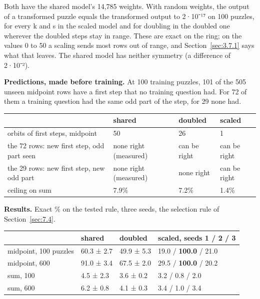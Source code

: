 Both have the shared model's 14,785 weights. With random weights, the output of a transformed puzzle equals the transformed output to 2·10⁻¹⁷ on 100 puzzles, for every k and s in the scaled model and for doubling in the doubled one wherever the doubled steps stay in range. These are exact on the ring; on the values 0 to 50 a scaling sends most rows out of range, and Section~\ref{sec:3.7.1} says what that leaves. The shared model has neither symmetry (a difference of 2·10⁻²).

\textbf{Predictions, made before training.} At 100 training puzzles, 101 of the 505 unseen midpoint rows have a first step that no training question had. For 72 of them a training question had the same odd part of the step, for 29 none had.

\begin{center}\small
\begin{tabularx}{\linewidth}{@{}YYll@{}}
\toprule
 & shared & doubled & scaled \\
\midrule
orbits of first steps, midpoint & 50 & 26 & 1 \\
the 72 rows: new first step, odd part seen & none right (measured) & can be right & can be right \\
the 29 rows: new first step, new odd part & none right (measured) & none right & can be right \\
ceiling on sum & 7.9\% & 7.2\% & 1.4\% \\
\bottomrule
\end{tabularx}
\end{center}

\textbf{Results.} Exact \% on the tested rule, three seeds, the selection rule of Section~\ref{sec:7.4}.

\begin{center}\small
\begin{tabular}{@{}llll@{}}
\toprule
 & shared & doubled & scaled, seeds 1 / 2 / 3 \\
\midrule
midpoint, 100 puzzles & 60.3 ± 2.7 & 49.9 ± 5.3 & 19.0 / \textbf{100.0} / 21.0 \\
midpoint, 600 & 91.0 ± 3.4 & 67.5 ± 2.0 & 29.5 / \textbf{100.0} / 20.2 \\
sum, 100 & 4.5 ± 2.3 & 3.6 ± 0.2 & 3.2 / 0.8 / 2.0 \\
sum, 600 & 6.2 ± 0.8 & 4.1 ± 0.3 & 3.4 / 1.0 / 3.4 \\
\bottomrule
\end{tabular}
\end{center}

